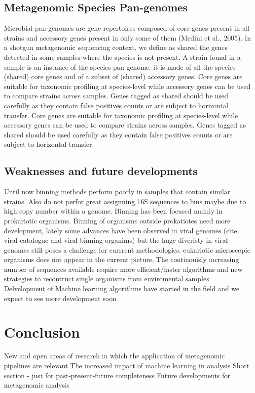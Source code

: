\documentclass{article}
\begin{document}
\subsection*{Metagenomic Species Pan-genomes}
Microbial pan-genomes are gene repertoires composed of core genes present in all strains and accessory genes present in only some of them (Medini et al., 2005).
In a shotgun metagenomic sequencing context, we define as shared the genes detected in some samples where the species is not present.
A strain found in a sample is an instance of the species pan-genome: it is made of all the species (shared) core genes and of a subset of (shared) accessory genes. Core genes are suitable for taxonomic profiling at species-level while accessory genes can be used to compare strains across samples. Genes tagged as shared should be used carefully as they contain false positives counts or are subject to horizontal transfer.
Core genes are suitable for taxonomic profiling at species-level while accessory genes can be used to compare strains across samples.
Genes tagged as shared should be used carefully as they contain false positives counts or are subject to horizontal transfer.

\subsection*{Weaknesses and future developments}
Until now binning methods perform poorly in samples that contain similar strains. Also do not perfor great assignning 16S sequences to bins maybe due to high copy number within a genome.
Binning has been focused mainly in prokariotic organisms. Binning of organisms outside prokatiotes need more development, lately some advances have been observed in viral genomes  (cite viral catalogue and viral binning organims) but the huge diveristy in viral genomes still poses a challenge for currrent methodologies. eukariotic microscopic organisms does not appear in the current picture. 
The continouisly increasing number of sequences available require more efficient/faster algorithms and new strategies to recontruct single organisms from enviromental samples.
Delvelopment of Machine learning algorithms have started in the field and we expect to see more development soon



\section*{Conclusion}
New and open areas of research in which the application of metagenomic pipelines are relevant
The increased impact of machine learning in analysis
Short section - just for past-present-future completeness
Future developments for metagenomic analysis


\end{document}
